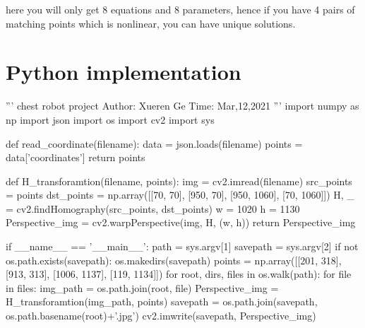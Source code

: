 \documentclass[12pt, a4 paper]{article}
\begin{document}
\indent here you will only get 8 equations and 8 parameters, hence
if you have 4 pairs of matching points which is nonlinear, you can
have unique solutions.

\section{Python implementation}
\begin{python}
'''
chest robot project
Author: Xueren Ge
Time: Mar,12,2021
'''
import numpy as np
import json
import os
import cv2
import sys


def read_coordinate(filename):
    data = json.loads(filename)
    points = data['coordinates']
    return points

def H_transforamtion(filename, points):
    img = cv2.imread(filename)
    src_points = points
    dst_points = np.array([[70, 70], [950, 70], [950, 1060], [70, 1060]])
    H, _ = cv2.findHomography(src_points, dst_points)
    w = 1020
    h = 1130
    Perspective_img = cv2.warpPerspective(img, H, (w, h))
    return Perspective_img


if __name__ == '__main__':
    path = sys.argv[1]
    savepath = sys.argv[2]
    if not os.path.exists(savepath):
        os.makedirs(savepath)
    points = np.array([[201, 318], [913, 313], [1006, 1137], [119, 1134]])
    for root, dirs, files in os.walk(path):
        for file in files:
            img_path = os.path.join(root, file)
            Perspective_img = H_transforamtion(img_path, points)
            savepath = os.path.join(savepath, os.path.basename(root)+'.jpg')
            cv2.imwrite(savepath, Perspective_img)
\end{python}
\end{document}

